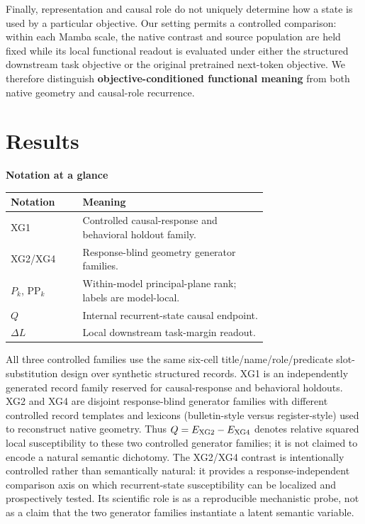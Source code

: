 \documentclass{article}
\begin{document}
Finally, representation and causal role do not uniquely determine how a state is used by a particular objective. Our setting permits a controlled comparison: within each Mamba scale, the native contrast and source population are held fixed while its local functional readout is evaluated under either the structured downstream task objective or the original pretrained next-token objective. We therefore distinguish \textbf{objective-conditioned functional meaning} from both native geometry and causal-role recurrence.

\section{Results}
\label{sec:results}

\noindent\begin{minipage}{\linewidth}
\centering\small
\textbf{Notation at a glance}\\[3pt]
\begin{tabular}{@{}lp{0.72\linewidth}@{}}
\toprule
Notation & Meaning \\
\midrule
XG1 & Controlled causal-response and behavioral holdout family. \\
XG2/XG4 & Response-blind geometry generator families. \\
$P_k$, $\mathrm{PP}_k$ & Within-model principal-plane rank; labels are model-local. \\
$Q$ & Internal recurrent-state causal endpoint. \\
$\Delta L$ & Local downstream task-margin readout. \\
\bottomrule
\end{tabular}
\end{minipage}
\par\medskip

All three controlled families use the same six-cell title/name/role/predicate slot-substitution design over synthetic structured records. XG1 is an independently generated record family reserved for causal-response and behavioral holdouts. XG2 and XG4 are disjoint response-blind generator families with different controlled record templates and lexicons (bulletin-style versus register-style) used to reconstruct native geometry. Thus $Q=E_{\rm XG2}-E_{\rm XG4}$ denotes relative squared local susceptibility to these two controlled generator families; it is not claimed to encode a natural semantic dichotomy. The XG2/XG4 contrast is intentionally controlled rather than semantically natural: it provides a response-independent comparison axis on which recurrent-state susceptibility can be localized and prospectively tested. Its scientific role is as a reproducible mechanistic probe, not as a claim that the two generator families instantiate a latent semantic variable.
\end{document}
